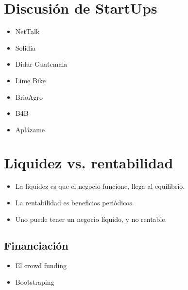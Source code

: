 \section{Discusión de StartUps}
\begin{itemize}
    \item NetTalk 
    \item Solidia 
    \item Didar Guatemala 
    \item Lime Bike 
    \item BrioAgro 
    \item B4B 
    \item Aplázame
\end{itemize}


\section{Liquidez vs. rentabilidad}
\begin{itemize}
    \item La liquidez es que el negocio funcione, llega al equilibrio.
    \item La rentabilidad es beneficios periódicos.
    \item Uno puede tener un negocio líquido, y no rentable.
\end{itemize}


\subsection{Financiación}
\begin{itemize}
    \item El crowd funding  
    \item Bootstraping
\end{itemize}
